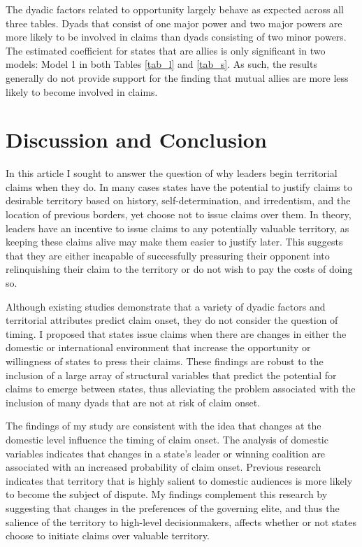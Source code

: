 The dyadic factors related to opportunity largely behave as expected across all three tables. Dyads that consist of one major power and two major powers are more likely to be involved in claims than dyads consisting of two minor powers. The estimated coefficient for states that are allies is only significant in two models: Model 1 in both Tables \ref{tab_l} and \ref{tab_s}. As such, the results generally do not provide support for the finding that mutual allies are more less likely to become involved in claims.

\section{Discussion and Conclusion}

In this article I sought to answer the question of why leaders begin territorial claims when they do. In many cases states have the potential to justify claims to desirable territory based on history, self-determination, and irredentism, and the location of previous borders, yet choose not to issue claims over them. In theory, leaders have an incentive to issue claims to any potentially valuable territory, as keeping these claims alive may make them easier to justify later. This suggests that they are either incapable of successfully pressuring their opponent into relinquishing their claim to the territory or do not wish to pay the costs of doing so.

Although existing studies demonstrate that a variety of dyadic factors and territorial attributes predict claim onset, they do not consider the question of timing. I proposed that states issue claims when there are changes in either the domestic or international environment that increase the opportunity or willingness of states to press their claims. These findings are robust to the inclusion of a large array of structural variables that predict the potential for claims to emerge between states, thus alleviating the problem associated with the inclusion of many dyads that are not at risk of claim onset.  

The findings of my study are consistent with the idea that changes at the domestic level influence the timing of claim onset. The analysis of domestic variables indicates that changes in a state's leader or winning coalition are associated with an increased probability of claim onset. Previous research indicates that territory that is highly salient to domestic audiences is more likely to become the subject of dispute. My findings complement this research by suggesting that changes in the preferences of the governing elite, and thus the salience of the territory to high-level decisionmakers, affects whether or not states choose to initiate claims over valuable territory. 

